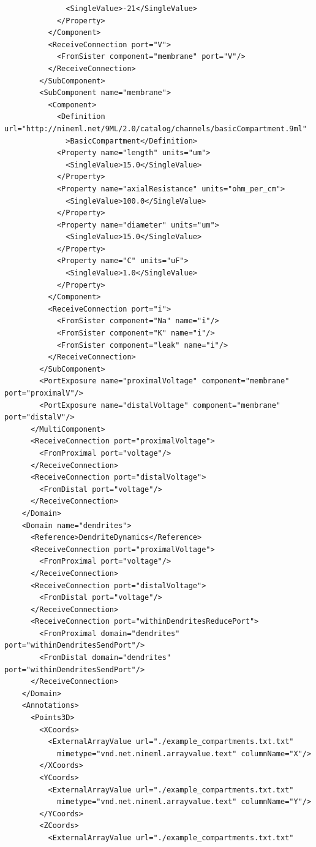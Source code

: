 \documentclass[draftspec]{ninemlspec}
\begin{document}
\begin{lstlisting}
              <SingleValue>-21</SingleValue>
            </Property>
          </Component>
          <ReceiveConnection port="V">
            <FromSister component="membrane" port="V"/>
          </ReceiveConnection>
        </SubComponent>
        <SubComponent name="membrane">
          <Component>
            <Definition url="http://nineml.net/9ML/2.0/catalog/channels/basicCompartment.9ml"
              >BasicCompartment</Definition>
            <Property name="length" units="um">
              <SingleValue>15.0</SingleValue>
            </Property>
            <Property name="axialResistance" units="ohm_per_cm">
              <SingleValue>100.0</SingleValue>
            </Property>
            <Property name="diameter" units="um">
              <SingleValue>15.0</SingleValue>
            </Property>
            <Property name="C" units="uF">
              <SingleValue>1.0</SingleValue>
            </Property>
          </Component>
          <ReceiveConnection port="i">
            <FromSister component="Na" name="i"/>
            <FromSister component="K" name="i"/>
            <FromSister component="leak" name="i"/>
          </ReceiveConnection>
        </SubComponent>
        <PortExposure name="proximalVoltage" component="membrane" port="proximalV"/>
        <PortExposure name="distalVoltage" component="membrane" port="distalV"/>
      </MultiComponent>
      <ReceiveConnection port="proximalVoltage">
        <FromProximal port="voltage"/>
      </ReceiveConnection>
      <ReceiveConnection port="distalVoltage">
        <FromDistal port="voltage"/>
      </ReceiveConnection>
    </Domain>
    <Domain name="dendrites">
      <Reference>DendriteDynamics</Reference>
      <ReceiveConnection port="proximalVoltage">
        <FromProximal port="voltage"/>
      </ReceiveConnection>
      <ReceiveConnection port="distalVoltage">
        <FromDistal port="voltage"/>
      </ReceiveConnection>
      <ReceiveConnection port="withinDendritesReducePort">
        <FromProximal domain="dendrites" port="withinDendritesSendPort"/>
        <FromDistal domain="dendrites" port="withinDendritesSendPort"/>
      </ReceiveConnection>
    </Domain>
    <Annotations>
      <Points3D>
        <XCoords>
          <ExternalArrayValue url="./example_compartments.txt.txt"
            mimetype="vnd.net.nineml.arrayvalue.text" columnName="X"/>
        </XCoords>
        <YCoords>
          <ExternalArrayValue url="./example_compartments.txt.txt"
            mimetype="vnd.net.nineml.arrayvalue.text" columnName="Y"/>
        </YCoords>
        <ZCoords>
          <ExternalArrayValue url="./example_compartments.txt.txt"

\end{lstlisting}
\end{document}
